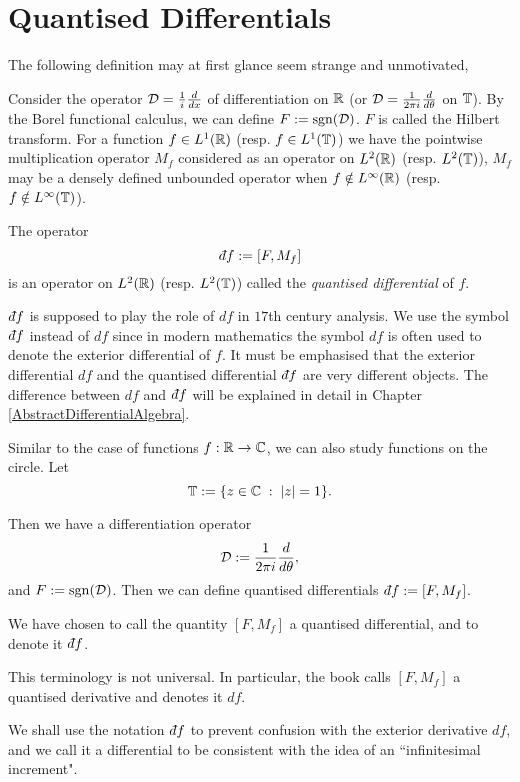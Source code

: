 \section{Quantised Differentials}
The following definition may at first glance seem strange and unmotivated,
\begin{definition}
    Consider the operator $\mathcal{D} = \frac{1}{i}\frac{d}{dx}$ of differentiation
    on $\mathbb{R}$ (or $\mathcal{D} = \frac{1}{2\pi i}\frac{d}{d\theta}$ on $\mathbb{T}$). By the Borel functional calculus, we can define $F := \operatorname{sgn}(\mathcal{D})$. 
    $F$ is called the Hilbert transform. For a function $f \in L^1(\mathbb{R})$ (resp. $f \in L^1(\mathbb{T})$)
    we have the pointwise multiplication
    operator $M_f$ considered as an operator on $L^2(\mathbb{R})$ (resp. $L^2(\mathbb{T})$), $M_f$
    may be a densely defined unbounded operator when $f \notin L^\infty(\mathbb{R})$ 
    (resp. $f \notin L^\infty(\mathbb{T})$).
    
    The operator
    \begin{equation}
        \qd f := [F,M_f]
    \end{equation}
    is an operator on $L^2(\mathbb{R})$ (resp. $L^2(\mathbb{T})$)
    called the \emph{quantised differential} of $f$.
\end{definition}

$\qd f$ is supposed to play the role of $df$ in $17$th century analysis. 
We use the symbol $\qd f$ instead of $df$ since in modern mathematics the symbol $df$
is often used to denote the exterior differential of $f$. It must be emphasised
that the exterior differential $df$ and the quantised differential $\qd f$ are very different objects.
The difference between $df$ and $\qd f$ will be explained in detail in Chapter \ref{AbstractDifferentialAlgebra}.

Similar to the case of functions $f:\mathbb{R}\rightarrow \mathbb{C}$, we can also
study functions on the circle. Let
\begin{equation}
    \mathbb{T} := \{z \in \mathbb{C}\;:\;|z| = 1\}.
\end{equation}

Then we have a differentiation operator 
\begin{equation}
    \mathcal{D} := \frac{1}{2\pi i} \frac{d}{d\theta},
\end{equation}
and $F := \operatorname{sgn}(\mathcal{D})$. Then we can define quantised
differentials $\qd f := [F,M_f]$. 

\begin{remark}
    We have chosen to call the quantity $[F,M_f]$
    a quantised differential, and to denote it $\qd f$. 
    
    This terminology is not universal. In particular, the book \cite{Connes94}
    calls $[F,M_f]$ a quantised derivative and denotes it $df$. 
    
    We shall use the notation $\qd f$ to prevent confusion with the exterior
    derivative $df$, and we call it a differential to be consistent
    with the idea of an ``infinitesimal increment".
\end{remark}    


